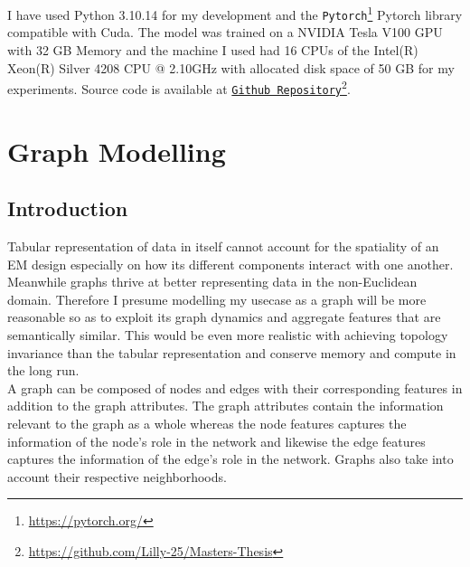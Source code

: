 \documentclass{report} %
\begin{document}
I have used Python 3.10.14 for my development and the \texttt{Pytorch}\footnote{\url{https://pytorch.org/}} Pytorch library compatible with Cuda.
The model was trained on a NVIDIA Tesla V100 \ac{GPU} with 32 GB Memory and the machine I used had 16 CPUs of the Intel(R) Xeon(R) Silver 4208 CPU @ 2.10GHz 
with allocated disk space of 50 GB for my experiments.
Source code is available at \texttt{\href{https://github.com/Lilly-25/Masters-Thesis}{Github Repository}}\footnote{\url{https://github.com/Lilly-25/Masters-Thesis}}.



\chapter{Graph Modelling} 

\section{Introduction}\label{sec:Introduction}

Tabular representation of data in itself cannot account for the spatiality of an \ac{EM} design especially on how its different components interact with one another. 
Meanwhile graphs thrive at better representing data in the non-Euclidean domain.
Therefore I presume modelling my usecase as a graph will be more reasonable so as to exploit its graph dynamics and aggregate features that are semantically similar.
This would be even more realistic with achieving topology invariance than the tabular representation and conserve memory and compute in the long run.\\

A graph can be composed of nodes and edges with their corresponding features in addition to the graph attributes.
The graph attributes contain the information relevant to the graph as a whole whereas the node features captures the information of the node's role in the network and 
likewise the edge features captures the information of the edge's role in the network. Graphs also take into account their respective neighborhoods.\\
\end{document}
